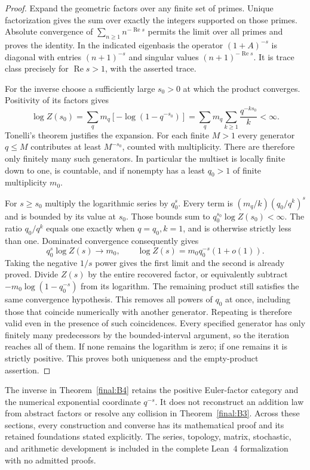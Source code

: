 \begin{proof}
Expand the geometric factors over any finite set of primes.  Unique
factorization gives the sum over exactly the integers supported on
those primes.  Absolute convergence of
$\sum_{n\geq1}n^{-\operatorname{Re}s}$ permits the limit over all
primes and proves the identity.  In the indicated eigenbasis the
operator $(1+A)^{-s}$ is diagonal with entries $(n+1)^{-s}$ and
singular values $(n+1)^{-\operatorname{Re}s}$.  It is trace class
precisely for $\operatorname{Re}s>1$, with the asserted trace.

For the inverse choose a sufficiently large $s_0>0$ at which the
product converges.  Positivity of its factors gives
\[
 \log Z(s_0)=\sum_qm_q[-\log(1-q^{-s_0})]
           =\sum_qm_q\sum_{k\geq1}\frac{q^{-ks_0}}k<\infty.
\]
Tonelli's theorem justifies the expansion.  For each finite $M>1$
every generator $q\leq M$ contributes at least $M^{-s_0}$, counted
with multiplicity.  There are therefore only finitely many such
generators.  In particular the multiset is locally finite down to
one, is countable, and if nonempty has a least $q_0>1$ of finite
multiplicity $m_0$.

For $s\geq s_0$ multiply the logarithmic series by $q_0^s$.
Every term is
$(m_q/k)(q_0/q^k)^s$ and is bounded by its value at $s_0$.
Those bounds sum to $q_0^{s_0}\log Z(s_0)<\infty$.  The ratio
$q_0/q^k$ equals one exactly when $q=q_0,k=1$, and is otherwise
strictly less than one.  Dominated convergence consequently gives
\[
 q_0^s\log Z(s)\longrightarrow m_0,
 \qquad\log Z(s)=m_0q_0^{-s}(1+o(1)).
\]
Taking the negative $1/s$ power gives the first limit and the second
is already proved.  Divide $Z(s)$ by the entire recovered factor,
or equivalently subtract
$-m_0\log(1-q_0^{-s})$ from its logarithm.  The remaining product
still satisfies the same convergence hypothesis.  This removes all
powers of $q_0$ at once, including those that coincide numerically
with another generator.  Repeating is therefore valid even in the
presence of such coincidences.  Every specified generator has only
finitely many predecessors by the bounded-interval argument, so
the iteration reaches all of them.  If none remains the logarithm
is zero; if one remains it is strictly positive.  This proves both
uniqueness and the empty-product assertion.
\end{proof}

The inverse in Theorem~\ref{final:B4} retains the positive Euler-factor
category and the numerical exponential coordinate $q^{-s}$.  It
does not reconstruct an addition law from abstract factors or
resolve any collision in Theorem~\ref{final:B3}.  Across these
sections, every construction and converse has its mathematical
proof and its retained foundations stated explicitly. The series,
topology, matrix, stochastic, and arithmetic development is included
in the complete Lean~4 formalization with no admitted proofs.

